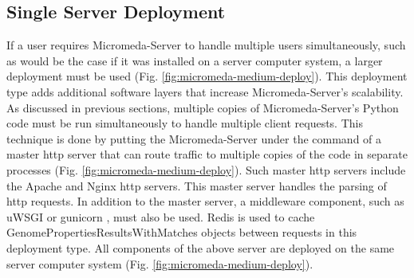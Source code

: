 \subsection{Single Server Deployment} \label{single-server-micromeda-deployment}

If a user requires Micromeda-Server to handle multiple users simultaneously, such as would be the case if it was installed on a server computer system, a larger deployment must be used (Fig. \ref{fig:micromeda-medium-deploy}). This deployment type adds additional software layers that increase Micromeda-Server's scalability. As discussed in previous sections, multiple copies of Micromeda-Server's Python code must be run simultaneously to handle multiple client requests. This technique is done by putting the Micromeda-Server under the command of a master \gls{http} server that can route traffic to multiple copies of the code in separate processes (Fig. \ref{fig:micromeda-medium-deploy}). Such master \gls{http} servers include the Apache \cite{fielding1997apache} and Nginx \cite{reese2008nginx} \gls{http} servers. This master server handles the parsing of \gls{http} requests. In addition to the master server, a middleware component, such as uWSGI \cite{2019uwsgi} or gunicorn \cite{chesneau_2018}, must also be used. Redis is used to cache GenomePropertiesResultsWithMatches objects between requests in this deployment type. All components of the above server are deployed on the same server computer system (Fig. \ref{fig:micromeda-medium-deploy}).

